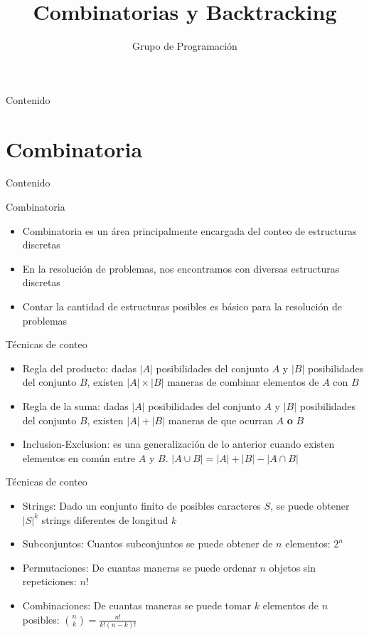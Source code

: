 \documentclass[handout]{beamer}
\title{Combinatorias y Backtracking}
\author{Grupo de Programaci\'on}
\institute{Taller de Programaci\'on}
\date{}
\begin{document}
\maketitle

\begin{frame}{Contenido}
\tableofcontents
\end{frame}

\section{Combinatoria}
\begin{frame}{Contenido}
\tableofcontents[currentsection]
\end{frame}

\begin{frame}{Combinatoria}
 \begin{itemize}
    \item Combinatoria es un \'area principalmente encargada del conteo de estructuras discretas
      \pause
    \item En la resoluci\'on de problemas, nos encontramos con diversas estructuras discretas
      \pause
    \item Contar la cantidad de estructuras posibles es b\'asico para la resoluci\'on de problemas
  \end{itemize}
\end{frame}

\begin{frame}{T\'ecnicas de conteo}
  \begin{itemize}
    \item Regla del producto: dadas $|A|$ posibilidades del conjunto $A$ y $|B|$ posibilidades del conjunto $B$, existen $|A|\times |B|$ maneras de combinar elementos de $A$ con $B$
      \pause
    \item Regla de la suma: dadas $|A|$ posibilidades del conjunto $A$ y $|B|$ posibilidades del conjunto $B$, existen $|A| + |B|$ maneras de que ocurran $A$ \textbf{o} $B$
      \pause
    \item Inclusion-Exclusion: es una generalizaci\'on de lo anterior cuando existen elementos en com\'un entre $A$ y $B$. $|A\cup B| = |A| + |B| - |A\cap B|$
  \end{itemize}
\end{frame}

\begin{frame}{T\'ecnicas de conteo}
  \begin{itemize}
    \item Strings: Dado un conjunto finito de posibles caracteres $S$, se puede obtener $|S|^k$ strings diferentes de longitud $k$
      \pause
    \item Subconjuntos: Cuantos subconjuntos se puede obtener de $n$ elementos: $2^n$
      \pause
    \item Permutaciones: De cuantas maneras se puede ordenar $n$ objetos sin repeticiones: $n!$
      \pause
    \item Combinaciones: De cuantas maneras se puede tomar $k$ elementos de $n$ posibles: $\binom{n}{k} = \frac{n!}{k!(n-k)!}$
  \end{itemize}
\end{frame}
\end{document}

